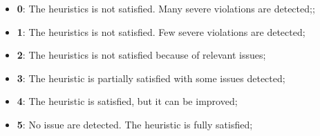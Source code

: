 \begin{itemize}
\item \textbf{0}: The heuristics is not satisfied. Many severe violations are detected;;
\item \textbf{1}: The heuristics is not satisfied. Few severe violations are detected;
\item \textbf{2}: The heuristics is not satisfied because of relevant issues;
\item \textbf{3}: The heuristic is partially satisfied with some issues detected;
\item \textbf{4}: The heuristic is satisfied, but it can be improved;
\item \textbf{5}: No issue are detected. The heuristic is fully satisfied; 
\end{itemize}

